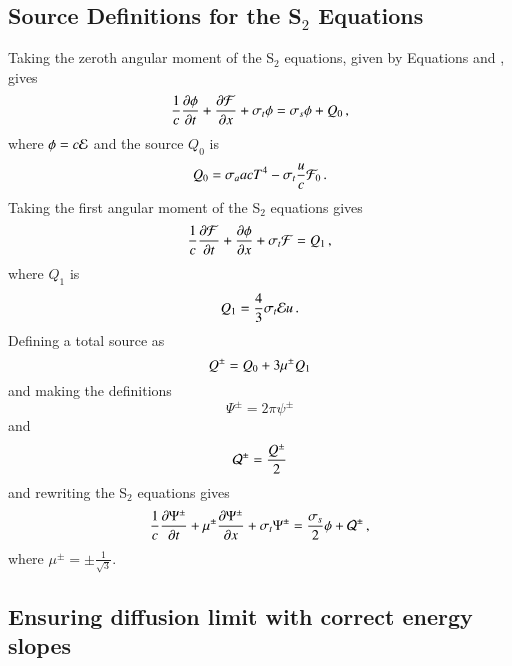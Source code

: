 \documentclass[preprint,12pt]{elsarticle}
\begin{document}
\subsection{Source Definitions for the \texorpdfstring{S$_2$}{S-2} Equations}

Taking the zeroth angular moment of the S$_2$ equations, given by Equations
 and , gives
\begin{equation}
\frac{1}{c}\dydt{\phi} + \dydx{\F} + \sigma_t\phi = \sigma_s\phi + Q_0 \pec
\lequ{zerothmoment}
\end{equation}
where $\phi = c\mathcal{E}$ and the source $Q_0$ is
\begin{equation}
Q_0 = \sigma_a acT^4 - \sigma_t\frac{u}{c}\F_0 \pep
\lequ{Q0}
\end{equation}
Taking the first angular moment of the S$_2$ equations gives
\begin{equation}
\frac{1}{c}\dydt{\F} + \dydx{\phi} + \sigma_t\F = Q_1 \pec
\lequ{firstmoment}
\end{equation}
where $Q_1$ is
\begin{equation}
Q_1 = \frac{4}{3}\sigma_t\E u \pep
\lequ{Q1}
\end{equation}
Defining a total source as
\begin{equation}
Q^\pm = Q_0 + 3\mu^\pm Q_1
\lequ{Qdef}
\end{equation}
and making the definitions
\begin{equation}
  \Psi^\pm = 2\pi\psi^\pm
\end{equation}
and
\begin{equation}
  \mathcal{Q}^\pm = \frac{Q^\pm}{2}
\end{equation}
and rewriting the S$_2$ equations gives
\begin{equation}\lequ{S2Q}
  \frac{1}{c}\dydt{\Psi^\pm} + \mu^\pm\dydx{\Psi^\pm} + \sigma_t\Psi^\pm
  = \frac{\sigma_s}{2}\phi + \Q^\pm \pec
\end{equation}
where $\mu^\pm=\pm\frac{1}{\sqrt{3}}$.

\subsection{Ensuring diffusion limit with correct energy slopes}
\end{document}
